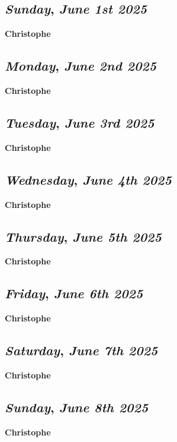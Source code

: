\begin{center}
\section*{\month}
\end{center}

\def\day{\textit{June 1st 2025}}
\def\weekday{\textit{Sunday}}
\subsection*{\weekday, \day}
\textbf {Christophe}

\def\day{\textit{June 2nd 2025}}
\def\weekday{\textit{Monday}}
\subsection*{\weekday, \day}
\textbf {Christophe}

\def\day{\textit{June 3rd 2025}}
\def\weekday{\textit{Tuesday}}
\subsection*{\weekday, \day}
\textbf {Christophe}

\def\day{\textit{June 4th 2025}}
\def\weekday{\textit{Wednesday}}
\subsection*{\weekday, \day}
\textbf {Christophe}

\def\day{\textit{June 5th 2025}}
\def\weekday{\textit{Thursday}}
\subsection*{\weekday, \day}
\textbf {Christophe}

\def\day{\textit{June 6th 2025}}
\def\weekday{\textit{Friday}}
\subsection*{\weekday, \day}
\textbf {Christophe}

\def\day{\textit{June 7th 2025}}
\def\weekday{\textit{Saturday}}
\subsection*{\weekday, \day}
\textbf {Christophe}

\def\day{\textit{June 8th 2025}}
\def\weekday{\textit{Sunday}}
\subsection*{\weekday, \day}
\textbf {Christophe}

